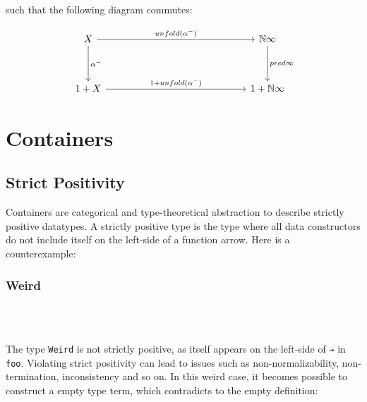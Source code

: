 such that the following diagram commutes:

\[
\begin{tikzcd}[row sep=huge, column sep=5.0cm]
X \arrow[r, "unfold(\alpha^{-})"] \arrow[d, "\alpha^{-}"]
& \mathbb{N}\infty \arrow[d, "pred\infty"] \\
1 + X \arrow[r, "1 + unfold(\alpha^{-})"]
& 1 + \mathbb{N}\infty
\end{tikzcd}
\]

\section{Containers}

\subsection{Strict Positivity}

Containers are categorical and type-theoretical abstraction to describe strictly positive datatypes. A strictly positive type is the type where all data constructors do not include itself on the left-side of a function arrow. Here is a counterexample:

\subsubsection*{Weird}

\begin{code}%
\>[0]\AgdaSymbol{\{-\#}\AgdaSpace{}%
\AgdaSpace{}%
\AgdaSymbol{\#-\}}\<%
\\
\>[0]\AgdaSpace{}%
\AgdaSpace{}%
\AgdaSymbol{:}\AgdaSpace{}%
\AgdaSpace{}%
\<%
\\
\>[0][@{}l@{\AgdaIndent{0}}]%
\>[2]\AgdaSpace{}%
\AgdaSymbol{:}\AgdaSpace{}%
\AgdaSymbol{(}\AgdaSpace{}%
\AgdaSpace{}%
\AgdaSymbol{)}\AgdaSpace{}%
\AgdaSpace{}%
\<%
\end{code}

The type \texttt{Weird} is not strictly positive, as itself appears on the left-side of \texttt{→} in \texttt{foo}. Violating strict positivity can lead to issues such as non-normalizability, non-termination, inconsistency and so on. In this weird case, it becomes possible to construct a empty type term, which contradicts to the empty definition:


